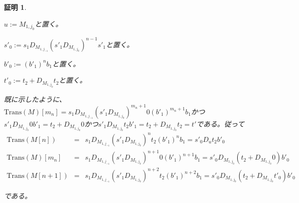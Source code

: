 \documentclass[dvipdfmx,uplatex]{jsarticle}
\newif\iffull
\theoremstyle{customnonumberbreakfortheorem}
\theoremstyle{customnonumberbreakforproof}
\newtheorem{hideableproof}{証明}
\begin{document}
\begin{hideableproof}
\begin{indented}
\begin{indented}
\begin{penumerate}
			\end{penumerate}
			\item \(u := M_{1,j_0}\)と置く。
			\item \(s'_0 := s_1 D_{M_{1,j_{-1}}} (s'_1 D_{M_{1,j_0}})^{n-1} s'_1\)と置く。
			\item \(b'_0 := (b'_1)^n b_1\)と置く。
			\item \(t'_0 := t_2 + D_{M_{1,j_0}} t_2\)と置く。
			\item 既に示したように、\(\textrm{Trans}(M)[m_n] = s_1 D_{M_{1,j_{-1}}} (s'_1 D_{M_{1,j_0}})^{m_n+1} 0 (b'_1)^{m_n+1} b_1\)かつ\(s'_1 D_{M_{1,j_0}} 0 b'_1 = t_2 + D_{M_{1,j_0}} 0\)かつ\(s'_1 D_{M_{1,j_0}} t_2 b'_1 = t_2 + D_{M_{1,j_0}} t_2 = t'\)である。従って
			\begin{eqnarray*}
			\textrm{Trans}(M[n]) & = & s_1 D_{M_{1,j_{-1}}} (s'_1 D_{M_{1,j_0}})^n t_2 (b'_1)^n b_1 = s'_0 D_u t_2 b'_0 \\
			\textrm{Trans}(M)[m_n] & = & s_1 D_{M_{1,j_{-1}}} (s'_1 D_{M_{1,j_0}})^{n+1} 0 (b'_1)^{n+1} b_1 = s'_0 D_{M_{1,j_0}}(t_2 + D_{M_{1,j_0}} 0) b'_0 \\
			\textrm{Trans}(M[n+1]) & = & s_1 D_{M_{1,j_{-1}}} (s'_1 D_{M_{1,j_0}})^{n+2} t_2 (b'_1)^{n+2} b_1 = s'_0 D_{M_{1,j_0}}(t_2 + D_{M_{1,j_0}} t'_0) b'_0
			\end{eqnarray*}
			\item である。
		\end{indented}
	\end{indented}
\end{hideableproof}

\iffull{それでは本題に戻る。}\fi
\end{document}
